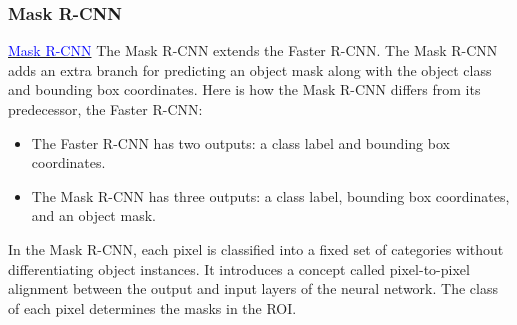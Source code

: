 \subsubsection{Mask R-CNN}
\textcolor{red}{\href{https://arxiv.org/pdf/1703.06870.pdf}{\textcolor{blue}{Mask R-CNN}}}
The Mask R-CNN extends the Faster R-CNN. The Mask R-CNN adds an extra branch for predicting an object mask along with the object class and bounding box coordinates.
Here is how the Mask R-CNN differs from its predecessor, the Faster R-CNN:
\begin{itemize}
    \item The Faster R-CNN has two outputs: a class label and bounding box coordinates.
    \item The Mask R-CNN has three outputs: a class label, bounding box coordinates, and an object mask.
\end{itemize}
In the Mask R-CNN, each pixel is classified into a fixed set of categories without differentiating object instances. It introduces a concept called pixel-to-pixel alignment between the output and input layers of the neural network. The class of each pixel determines the masks in the ROI.

